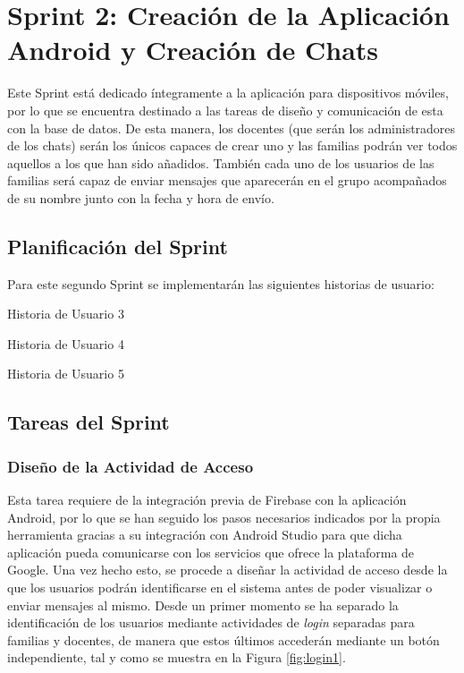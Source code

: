 \clearpage

\section{Sprint 2: Creación de la Aplicación Android y Creación de Chats}
Este Sprint está dedicado íntegramente a la aplicación para dispositivos móviles, por lo que se encuentra destinado a las tareas de diseño y comunicación de esta con la base de datos. De esta manera, los docentes (que serán los administradores de los chats) serán los únicos capaces de crear uno y las familias podrán ver todos aquellos a los que han sido añadidos. También cada uno de los usuarios de las familias será capaz de enviar mensajes que aparecerán en el grupo acompañados de su nombre junto con la fecha y hora de envío.

\subsection{Planificación del Sprint}
Para este segundo Sprint se implementarán las siguientes historias de usuario:

\begin{table}[!htbp]
	\centering
	{\small
		
	}
	\caption[Historia de Usuario 3]
	{Historia de Usuario 3}
	\label{tab:historia3}
\end{table}

\begin{table}[!htbp]
	\centering
	{\small
		
	}
	\caption[Historia de Usuario 4]
	{Historia de Usuario 4}
	\label{tab:historia4}
\end{table}

\begin{table}[!htbp]
	\centering
	{\small
		
	}
	\caption[Historia de Usuario 5]
	{Historia de Usuario 5}
	\label{tab:historia5}
\end{table}

\newpage

\subsection{Tareas del Sprint}
\subsubsection{Diseño de la Actividad de Acceso}
Esta tarea requiere de la integración previa de Firebase con la aplicación Android, por lo que se han seguido los pasos necesarios indicados por la propia herramienta gracias a su integración con Android Studio para que dicha aplicación pueda comunicarse con los servicios que ofrece la plataforma de Google. Una vez hecho esto, se procede a diseñar la actividad de acceso desde la que los usuarios podrán identificarse en el sistema antes de poder visualizar o enviar mensajes al mismo. Desde un primer momento se ha separado la identificación de los usuarios mediante actividades de \textit{login} separadas para familias y docentes, de manera que estos últimos accederán mediante un botón independiente, tal y como se muestra en la Figura \ref{fig:login1}.

